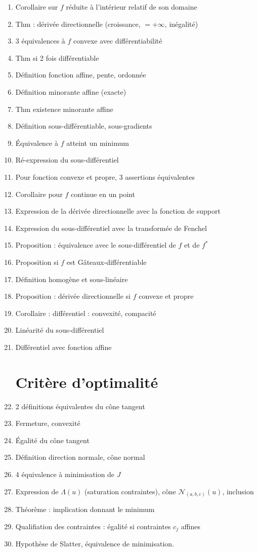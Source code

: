 \documentclass{article}
\begin{document}
\begin{enumerate}
	\item Corollaire sur $f$ réduite à l'intérieur relatif de son domaine
	\item Thm : dérivée directionnelle (croissance, $=+\infty$, inégalité)
	\item 3 équivalences à $f$ convexe avec différentiabilité
	\item Thm si 2 fois différentiable
	\item Définition fonction affine, pente, ordonnée
	\item Définition minorante affine (exacte)
	\item Thm existence minorante affine
	\item Définition sous-différentiable, sous-gradients
	\item Équivalence à $f$ atteint un minimum
	\item Ré-expression du sous-différentiel
	\item Pour fonction convexe et propre, 3 assertions équivalentes
	\item Corollaire pour $f$ continue en un point
	\item Expression de la dérivée directionnelle avec la fonction de support
	\item Expression du sous-différentiel avec la transformée de Fenchel
	\item Proposition : équivalence avec le sous-différentiel de $f$ et de $f^*$
	\item Proposition si $f$ est Gâteaux-différentiable
	\item Définition homogène et sous-linéaire
	\item Proposition : dérivée directionnelle si $f$ convexe et propre
	\item Corollaire : différentiel : convexité, compacité
	\item Linéarité du sous-différentiel
	\item Différentiel avec fonction affine
	\section{Critère d'optimalité}
	\item 2 définitions équivalentes du cône tangent
	\item Fermeture, convexité
	\item Égalité du cône tangent
	\item Définition direction normale, cône normal
	\item 4 équivalence à minimisation de $J$ 
	\item Expression de $\Lambda(u)$ (saturation contraintes), cône $\mathscr{N}_{(a,b,c)}(u)$, inclusion
	\item Théorème : implication donnant le minimum
	\item Qualifiation des contraintes : égalité si contraintes $c_j$ affines
	\item Hypothèse de Slatter, équivalence de minimisation.
\end{enumerate}
\end{document}
